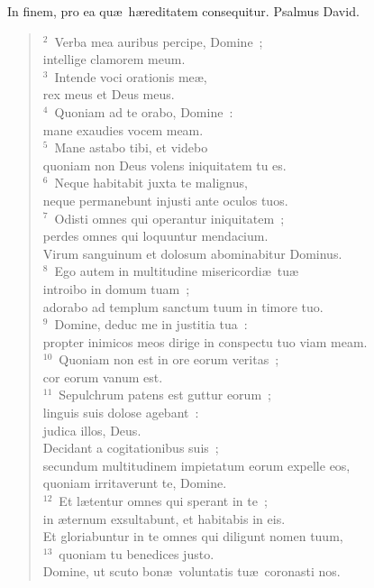 \bchapter
\lettrine[lines=3,image=true,loversize=0.05,lraise=-0.03]{I}{}n finem, pro ea qu\ae\ h\ae reditatem consequitur. Psalmus David.
\begin{flushleft}\begin{verse}\vspace{6pt}${}^{2}$~Verba mea auribus percipe, Domine~;\\ intellige clamorem meum.\\
${}^{3}$~Intende voci orationis me\ae ,\\ rex meus et Deus meus.\\
${}^{4}$~Quoniam ad te orabo, Domine~:\\ mane exaudies vocem meam.\\
${}^{5}$~Mane astabo tibi, et videbo\\ quoniam non Deus volens iniquitatem tu es.\\
${}^{6}$~Neque habitabit juxta te malignus,\\ neque permanebunt injusti ante oculos tuos.\\
${}^{7}$~Odisti omnes qui operantur iniquitatem~;\\ perdes omnes qui loquuntur mendacium.\\ Virum sanguinum et dolosum abominabitur Dominus.\\
${}^{8}$~Ego autem in multitudine misericordi\ae\ tu\ae \\ introibo in domum tuam~;\\ adorabo ad templum sanctum tuum in timore tuo.\\
${}^{9}$~Domine, deduc me in justitia tua~:\\ propter inimicos meos dirige in conspectu tuo viam meam.\\
${}^{10}$~Quoniam non est in ore eorum veritas~;\\ cor eorum vanum est.\\
${}^{11}$~Sepulchrum patens est guttur eorum~;\\ linguis suis dolose agebant~:\\ judica illos, Deus.\\ Decidant a cogitationibus suis~;\\ secundum multitudinem impietatum eorum expelle eos,\\ quoniam irritaverunt te, Domine.\\
${}^{12}$~Et l\ae tentur omnes qui sperant in te~;\\ in \ae ternum exsultabunt, et habitabis in eis.\\ Et gloriabuntur in te omnes qui diligunt nomen tuum,\\
${}^{13}$~quoniam tu benedices justo.\\ Domine, ut scuto bon\ae\ voluntatis tu\ae\ coronasti nos.\end{verse}\end{flushleft}



